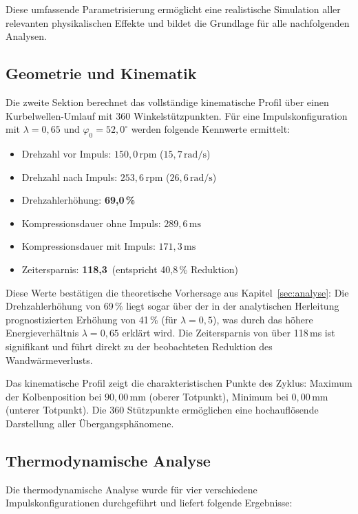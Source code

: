 ﻿\documentclass[a4paper,12pt]{article}
\begin{document}
Diese umfassende Parametrisierung ermöglicht eine realistische Simulation
aller relevanten physikalischen Effekte und bildet die Grundlage für alle
nachfolgenden Analysen.

\subsection{Geometrie und Kinematik}

Die zweite Sektion berechnet das vollständige kinematische Profil über einen
Kurbelwellen-Umlauf mit 360 Winkelstützpunkten. Für eine Impulskonfiguration
mit $\lambda = 0{,}65$ und $\varphi_0 = 52{,}0^\circ$ werden folgende
Kennwerte ermittelt:

\begin{itemize}
  \item Drehzahl vor Impuls: $150{,}0\,\text{rpm}$ ($15{,}7\,\text{rad/s}$)
  \item Drehzahl nach Impuls: $253{,}6\,\text{rpm}$ ($26{,}6\,\text{rad/s}$)
  \item Drehzahlerhöhung: \textbf{69{,}0\,\%}
  \item Kompressionsdauer ohne Impuls: $289{,}6\,\text{ms}$
  \item Kompressionsdauer mit Impuls: $171{,}3\,\text{ms}$
  \item Zeitersparnis: \textbf{118{,}3\,} (entspricht 40{,}8\,\% Reduktion)
\end{itemize}

Diese Werte bestätigen die theoretische Vorhersage aus Kapitel~\ref{sec:analyse}:
Die Drehzahlerhöhung von 69\,\% liegt sogar über der in der analytischen
Herleitung prognostizierten Erhöhung von 41\,\% (für $\lambda = 0{,}5$),
was durch das höhere Energieverhältnis $\lambda = 0{,}65$ erklärt wird.
Die Zeitersparnis von über 118\,ms ist signifikant und führt direkt zu
der beobachteten Reduktion des Wandwärmeverlusts.

Das kinematische Profil zeigt die charakteristischen Punkte des Zyklus:
Maximum der Kolbenposition bei $90{,}00\,\text{mm}$ (oberer Totpunkt),
Minimum bei $0{,}00\,\text{mm}$ (unterer Totpunkt). Die 360 Stützpunkte
ermöglichen eine hochauflösende Darstellung aller Übergangsphänomene.

\subsection{Thermodynamische Analyse}

Die thermodynamische Analyse wurde für vier verschiedene Impulskonfigurationen
durchgeführt und liefert folgende Ergebnisse:
\end{document}
